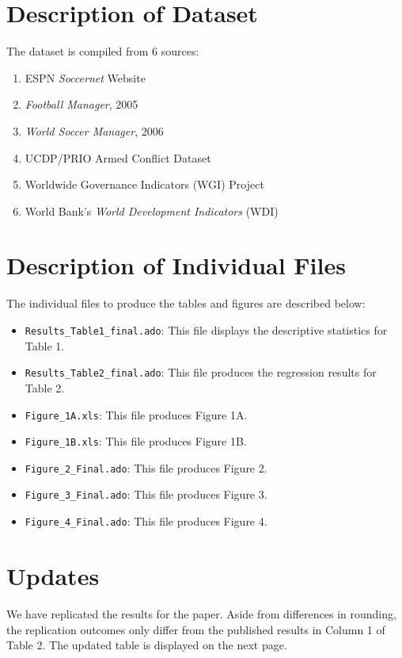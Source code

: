 \documentclass[11pt]{article}
\begin{document}
\onehalfspacing \allowdisplaybreaks \setlength{\parindent}{20pt}
\pagestyle{fancy}  
\fancyfoot[C]{} \normalsize

\section{Description of Dataset}
	
The dataset is compiled from 6 sources: 
\begin{enumerate}
	\item ESPN \emph{Soccernet} Website
	\item \emph{Football Manager}, 2005
	\item \emph{World Soccer Manager}, 2006
	\item UCDP/PRIO Armed Conflict Dataset
	\item Worldwide Governance Indicators (WGI) Project
	\item World Bank's \emph{World Development Indicators} (WDI)
\end{enumerate}

\section{Description of Individual Files}

The individual files to produce the tables and figures are described below:

\begin{itemize}
	\item \texttt{Results\_Table1\_final.ado}: This file displays the descriptive statistics for Table 1.
	\item \texttt{Results\_Table2\_final.ado}: This file produces the regression results for Table 2.
	\item \texttt{Figure\_1A.xls}: This file produces Figure 1A.
	\item \texttt{Figure\_1B.xls}: This file produces Figure 1B.
	\item \texttt{Figure\_2\_Final.ado}: This file produces Figure 2.
	\item \texttt{Figure\_3\_Final.ado}: This file produces Figure 3.
	\item \texttt{Figure\_4\_Final.ado}: This file produces Figure 4.
\end{itemize}	

\section{Updates}
We have replicated the results for the paper. Aside from differences in rounding, the replication outcomes only differ from the published results in Column 1 of Table 2. The updated table is displayed on the next page.
\end{document}
